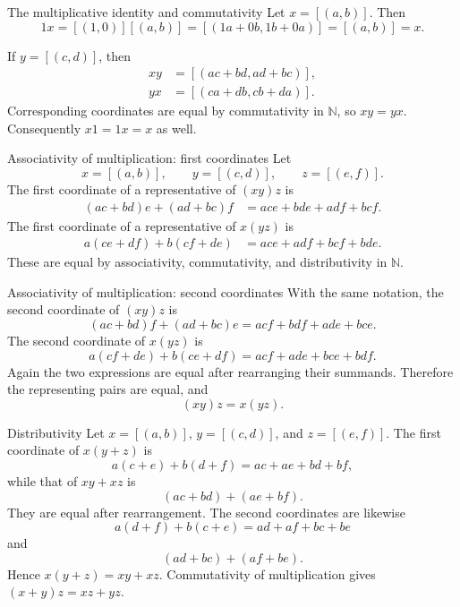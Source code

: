 \documentclass[aspectratio=169,11pt]{beamer}
\newcommand{\N}{\mathbb N}
\newcommand{\cl}[2]{\left[(#1,#2)\right]}
\begin{document}
\begin{frame}{The multiplicative identity and commutativity}
  Let \(x=\cl{a}{b}\).  Then
  \[
    1x
      =\cl{1}{0}\cl{a}{b}
      =\cl{1a+0b}{1b+0a}
      =\cl{a}{b}
      =x.
  \]

  If \(y=\cl{c}{d}\), then
  \begin{align*}
    xy&=\cl{ac+bd}{ad+bc},\\
    yx&=\cl{ca+db}{cb+da}.
  \end{align*}
  Corresponding coordinates are equal by commutativity in \(\N\), so \(xy=yx\).
  Consequently \(x1=1x=x\) as well.
\end{frame}

\begin{frame}{Associativity of multiplication: first coordinates}
  \footnotesize
  Let
  \[
    x=\cl{a}{b},\qquad y=\cl{c}{d},\qquad z=\cl{e}{f}.
  \]
  The first coordinate of a representative of \((xy)z\) is
  \begin{align*}
    (ac+bd)e+(ad+bc)f
      &=ace+bde+adf+bcf.
  \end{align*}
  The first coordinate of a representative of \(x(yz)\) is
  \begin{align*}
    a(ce+df)+b(cf+de)
      &=ace+adf+bcf+bde.
  \end{align*}
  These are equal by associativity, commutativity, and distributivity in \(\N\).
\end{frame}

\begin{frame}{Associativity of multiplication: second coordinates}
  \footnotesize
  With the same notation, the second coordinate of \((xy)z\) is
  \[
    (ac+bd)f+(ad+bc)e
      =acf+bdf+ade+bce.
  \]
  The second coordinate of \(x(yz)\) is
  \[
    a(cf+de)+b(ce+df)
      =acf+ade+bce+bdf.
  \]
  Again the two expressions are equal after rearranging their summands.
  Therefore the representing pairs are equal, and
  \[
    \boxed{(xy)z=x(yz).}
  \]
\end{frame}

\begin{frame}{Distributivity}
  \footnotesize
  Let \(x=\cl{a}{b}\), \(y=\cl{c}{d}\), and \(z=\cl{e}{f}\).
  The first coordinate of \(x(y+z)\) is
  \[
    a(c+e)+b(d+f)=ac+ae+bd+bf,
  \]
  while that of \(xy+xz\) is
  \[
    (ac+bd)+(ae+bf).
  \]
  They are equal after rearrangement.  The second coordinates are likewise
  \[
    a(d+f)+b(c+e)=ad+af+bc+be
  \]
  and
  \[
    (ad+bc)+(af+be).
  \]
  Hence \(x(y+z)=xy+xz\).  Commutativity of multiplication gives
  \((x+y)z=xz+yz\).
\end{frame}
\end{document}
